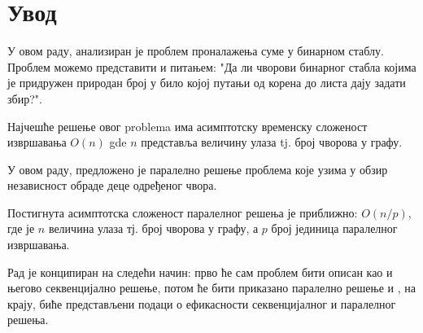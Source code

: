 \section{Увод}
У овом раду, анализиран је проблем проналажења суме у бинарном стаблу. Проблем можемо представити и питањем: "Да ли чворови бинарног стабла којима је придружен
природан број у било којој путањи од корена до листа дају задати збир?".

Најчешће решење овог problema има асимптотску временску сложеност извршавања $O(n)$ gde $n$ представља величину улаза tj. број чворова у графу.

У овом раду, предложено је паралелно решење проблема које узима у обзир независност обраде деце одређеног чвора.

Постигнута асимптотска сложеност паралелног решења је приближно: $O(n/p)$, где је $n$ величина улаза тј. број чворова у графу, а $p$ број јединица паралелног извршавања.

Рад је конципиран на следећи начин: прво ће сам проблем бити описан као и његово секвенцијално решење, потом ће бити приказано паралелно решење и
, на крају, биће представљени подаци о ефикасности секвенцијалног и паралелног решења.
\pagebreak